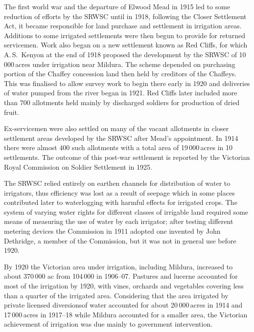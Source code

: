 The first world war and the departure of Elwood Mead  in 1915 led to some reduction of efforts by the SRWSC until in
1918, following the Closer Settlement Act,
 it became
responsible for land purchase and settlement in irrigation areas.
Additions to some irrigated settlements were then begun to provide for
returned servicemen.  Work also began on a new settlement known as Red
Cliffs,  for which A.\,S.~Kenyon
  at the end of 1918 proposed the development by
the SRWSC of 10\,000\,acres under irrigation near Mildura.  The scheme
depended on purchasing portion of the Chaffey concession land then
held by creditors of the Chaffeys.  This was finalised to allow survey
work to begin there early in 1920 and deliveries of water
pumped from the river began in 1921.  Red
Cliffs later included more than 700 allotments held mainly by
discharged soldiers for production of dried
fruit.

Ex-servicemen were also settled on many of the vacant allotments in
closer settlement areas developed by the SRWSC after Mead's
appointment.  In 1914 there were almost 400 such allotments with a
total area of 19\,000\,acres in 10 settlements. The outcome of this
post-war settlement is reported by the Victorian Royal Commission on
Soldier Settlement in 1925.

The SRWSC relied entirely on earthen
channels for distribution of water to
irrigators, thus efficiency was lost as a result of seepage
 which in some places contributed later to waterlogging
 with harmful effects for irrigated
crops.  The system of varying water rights for different classes of
irrigable land required some means of measuring the use of water by
each irrigator; after testing different metering devices the
Commission in 1911 adopted one invented by John Dethridge, a member of
the Commission, but it was not in general use before
1920.

By 1920 the Victorian area under irrigation, including Mildura,
  increased to about 370\,000 ac from 104\,000 in
1906--07.  Pastures and luc\-er\-ne
accounted for most of the irrigation by 1920, with
vines, orchards and
vegetables covering less than a quarter of the
irrigated area. Considering that the area irrigated by private
licensed diversionsof water accounted for about 20\,000\,acres in 1914
and 17\,000\,acres in 1917--18 while Mildura accounted for a smaller
area, the Victorian achievement of irrigation was due mainly to
government intervention.

